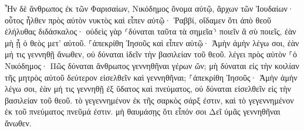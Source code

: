 \documentclass{openreader}
\begin{document}
Ἦν δὲ ἄνθρωπος ἐκ τῶν Φαρισαίων, Νικόδημος ὄνομα αὐτῷ, ἄρχων τῶν Ἰουδαίων· 
οὗτος ἦλθεν πρὸς αὐτὸν νυκτὸς καὶ εἶπεν αὐτῷ· Ῥαββί, οἴδαμεν ὅτι ἀπὸ θεοῦ ἐλήλυθας διδάσκαλος· οὐδεὶς γὰρ ⸂δύναται ταῦτα τὰ σημεῖα⸃ ποιεῖν ἃ σὺ ποιεῖς, ἐὰν μὴ ᾖ ὁ θεὸς μετ’ αὐτοῦ. 
⸀ἀπεκρίθη Ἰησοῦς καὶ εἶπεν αὐτῷ· Ἀμὴν ἀμὴν λέγω σοι, ἐὰν μή τις γεννηθῇ ἄνωθεν, οὐ δύναται ἰδεῖν τὴν βασιλείαν τοῦ θεοῦ. 
λέγει πρὸς αὐτὸν ⸀ὁ Νικόδημος· Πῶς δύναται ἄνθρωπος γεννηθῆναι γέρων ὤν; μὴ δύναται εἰς τὴν κοιλίαν τῆς μητρὸς αὐτοῦ δεύτερον εἰσελθεῖν καὶ γεννηθῆναι; 
⸀ἀπεκρίθη Ἰησοῦς· Ἀμὴν ἀμὴν λέγω σοι, ἐὰν μή τις γεννηθῇ ἐξ ὕδατος καὶ πνεύματος, οὐ δύναται εἰσελθεῖν εἰς τὴν βασιλείαν τοῦ θεοῦ. 
τὸ γεγεννημένον ἐκ τῆς σαρκὸς σάρξ ἐστιν, καὶ τὸ γεγεννημένον ἐκ τοῦ πνεύματος πνεῦμά ἐστιν. 
μὴ θαυμάσῃς ὅτι εἶπόν σοι Δεῖ ὑμᾶς γεννηθῆναι ἄνωθεν. 
\end{document}
